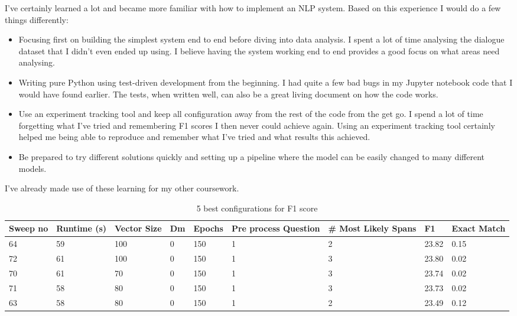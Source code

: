\documentclass[11pt]{article}
\begin{document}
    I've certainly learned a lot and became more familiar with how to implement an NLP system. Based on this experience I would do a
    few things differently:
    \begin{itemize}
        \item Focusing first on building the simplest system end to end before diving into data analysis. I spent a lot of
        time analysing the dialogue dataset that I didn't even ended up using. I believe having the system working end to
        end provides a good focus on what areas need analysing.
        \item Writing pure Python using test-driven development from the beginning. I had quite a few bad bugs in my
        Jupyter notebook code that I would have found earlier. The tests, when written well, can also be a great living
        document on how the code works.
        \item Use an experiment tracking tool and keep all configuration away from the rest of the code from the get go.
        I spend a lot of time forgetting what I've tried and remembering F1 scores I then never could achieve again. Using
        an experiment tracking tool certainly helped me being able to reproduce and remember what I've tried and what results
        this achieved.
        \item Be prepared to try different solutions quickly and setting up a pipeline where the model can be easily changed
        to many different models.
    \end{itemize}

    I've already made use of these learning for my other coursework.

    
    

    \begin{table}[p]
        \centering
        \begin{tabularx}{\textwidth}{|X|X|X|X|X|X|X|X|X|}
            \hline
            Sweep no & Runtime (s) & Vector Size & Dm & Epochs & Pre process Question & \# Most Likely Spans & F1 & Exact Match \\ \hline
            64       & 59          & 100         & 0  & 150    & 1                    & 2                    & 23.82 & 0.15        \\ \hline
            72       & 61          & 100         & 0  & 150    & 1                    & 3                    & 23.80 & 0.02        \\ \hline
            70       & 61          & 70          & 0  & 150    & 1                    & 3                    & 23.74 & 0.02        \\ \hline
            71       & 58          & 80          & 0  & 150    & 1                    & 3                    & 23.73 & 0.02        \\ \hline
            63       & 58          & 80          & 0  & 150    & 1                    & 2                    & 23.49 & 0.12        \\ \hline
        \end{tabularx}
        \caption{5 best configurations for F1 score}
        \label{table:5-best-f1}
    \end{table}
\end{document}
